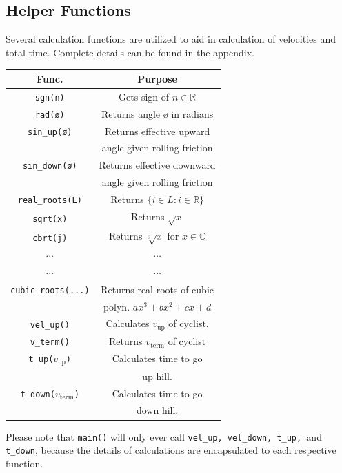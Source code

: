 \documentclass[twocolumn]{article}
\newcommand{\R}{\mathbb{R}}
\newcommand{\C}{\mathbb{C}}
\begin{document}
\subsection{Helper Functions}
Several calculation functions are utilized to aid in calculation of velocities and total time. Complete details can be found in the appendix.\newcommand{\ct}[1]{\texttt{#1}}
\begin{center}\small
    \begin{supertabular}{|c|c|}
        \hline
        \textbf{Func.} &\textbf{Purpose} \\ \hline
        \ct{sgn(n)} & Gets sign of $n\in \R$\\ \hline
        \ct{rad(ø)} & Returns angle ø in radians\\ \hline
        \ct{sin\_up(ø)} & Returns effective upward\\ &angle given rolling friction\\\hline
        \ct{sin\_down(ø)} & Returns effective downward \\ &angle given rolling friction\\\hline
        \ct{real\_roots(L)} & Returns $\{i\in L: i\in \R\}$\\\hline
        \ct{sqrt(x)}& Returns $\sqrt x$\\\hline
        \ct{cbrt(j)}& Returns $\sqrt[3]x$ for $x\in \C$\\\hline
        $\cdots$&$\cdots$\\
        $\cdots$&$\cdots$\\\hline
        \ct{cubic\_roots(...)}& Returns real roots of cubic\\&polyn. $ax^3+bx^2+cx+d$\\\hline
        \ct{vel\_up()}& Calculates $v_\text{up}$ of cyclist.\\\hline
        \ct{v\_term()}& Returns $v_\text{term}$ of cyclist\\\hline
        \ct{t\_up($v_\text{up}$)}& Calculates time to go \\&up hill.\\\hline
        \ct{t\_down($v_\text{term}$)}& Calculates time to go\\&down hill.\\\hline
    \end{supertabular}\normalsize
\end{center}
Please note that \ct{main()} will only ever call \ct{vel\_up, vel\_down, t\_up, }and \ct{t\_down}, because the details of calculations are encapsulated to each respective function. 
\end{document}
